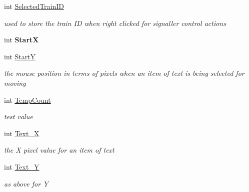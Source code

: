 \begin{DoxyCompactItemize}
\mbox{\label{class_t_interface_adbfa6e3d518a79685c87dbf0ac74b2ee}} 
int \mbox{\hyperlink{class_t_interface_adbfa6e3d518a79685c87dbf0ac74b2ee}{Selected\+Train\+ID}}
\begin{DoxyCompactList}\small\item\em used to store the train ID when right clicked for signaller control actions \end{DoxyCompactList}\item 
\mbox{\label{class_t_interface_a3d33fe8a440f6ce7afec6a13e11d423b}} 
int {\bfseries StartX}
\item 
\mbox{\label{class_t_interface_ab0cdc0f538f6f6744776ef7198cadb43}} 
int \mbox{\hyperlink{class_t_interface_ab0cdc0f538f6f6744776ef7198cadb43}{StartY}}
\begin{DoxyCompactList}\small\item\em the mouse position in terms of pixels when an item of text is being selected for moving \end{DoxyCompactList}\item 
\mbox{\label{class_t_interface_aaea529fe22bcc881ee04cf9baae6ce2f}} 
int \mbox{\hyperlink{class_t_interface_aaea529fe22bcc881ee04cf9baae6ce2f}{Temp\+Count}}
\begin{DoxyCompactList}\small\item\em test value \end{DoxyCompactList}\item 
\mbox{\label{class_t_interface_a1a4cec30a0c45fb9dccf1477ed513ec1}} 
int \mbox{\hyperlink{class_t_interface_a1a4cec30a0c45fb9dccf1477ed513ec1}{Text\+\_\+X}}
\begin{DoxyCompactList}\small\item\em the \textquotesingle{}X\textquotesingle{} pixel value for an item of text \end{DoxyCompactList}\item 
\mbox{\label{class_t_interface_a490a8a7dbd3ff53297f30f43b02d5c7e}} 
int \mbox{\hyperlink{class_t_interface_a490a8a7dbd3ff53297f30f43b02d5c7e}{Text\+\_\+Y}}
\begin{DoxyCompactList}\small\item\em as above for \textquotesingle{}Y\textquotesingle{} \end{DoxyCompactList}\item 

\end{DoxyCompactItemize}
